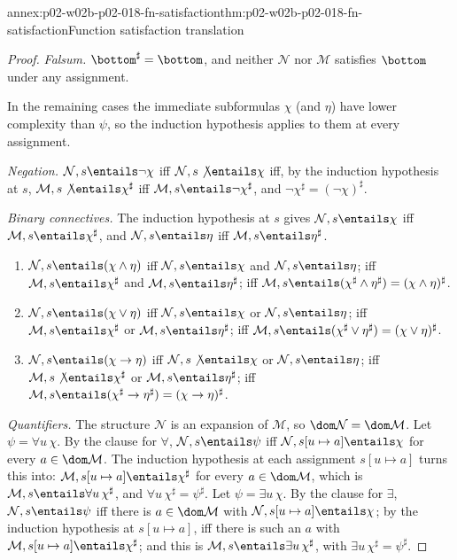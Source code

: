 \begin{annexitem}{annex:p02-w02b-p02-018-fn-satisfaction}{thm:p02-w02b-p02-018-fn-satisfaction}{Function satisfaction translation}
\begin{proof}
\emph{Falsum.}  \(\bottom^{\sharp}=\bottom\), and neither \(\mathcal N\)
nor \(\mathcal M\) satisfies \(\bottom\) under any assignment.

In the remaining cases the immediate subformulas \(\chi\) (and \(\eta\))
have lower complexity than \(\psi\), so the induction hypothesis applies to
them at every assignment.

\emph{Negation.}  \(\mathcal N,s\entails\neg\chi\) iff
\(\mathcal N,s\not\entails\chi\) iff, by the induction hypothesis at \(s\),
\(\mathcal M,s\not\entails\chi^{\sharp}\) iff
\(\mathcal M,s\entails\neg\chi^{\sharp}\), and
\(\neg\chi^{\sharp}=(\neg\chi)^{\sharp}\).

\emph{Binary connectives.}  The induction hypothesis at \(s\) gives
\(\mathcal N,s\entails\chi\) iff \(\mathcal M,s\entails\chi^{\sharp}\), and
\(\mathcal N,s\entails\eta\) iff \(\mathcal M,s\entails\eta^{\sharp}\).
\begin{enumerate}
 \item \(\mathcal N,s\entails(\chi\land\eta)\) iff
       \(\mathcal N,s\entails\chi\) and \(\mathcal N,s\entails\eta\); iff
       \(\mathcal M,s\entails\chi^{\sharp}\) and
       \(\mathcal M,s\entails\eta^{\sharp}\); iff
       \(\mathcal M,s\entails(\chi^{\sharp}\land\eta^{\sharp})
       =(\chi\land\eta)^{\sharp}\).
 \item \(\mathcal N,s\entails(\chi\lor\eta)\) iff
       \(\mathcal N,s\entails\chi\) or \(\mathcal N,s\entails\eta\); iff
       \(\mathcal M,s\entails\chi^{\sharp}\) or
       \(\mathcal M,s\entails\eta^{\sharp}\); iff
       \(\mathcal M,s\entails(\chi^{\sharp}\lor\eta^{\sharp})
       =(\chi\lor\eta)^{\sharp}\).
 \item \(\mathcal N,s\entails(\chi\to\eta)\) iff
       \(\mathcal N,s\not\entails\chi\) or \(\mathcal N,s\entails\eta\); iff
       \(\mathcal M,s\not\entails\chi^{\sharp}\) or
       \(\mathcal M,s\entails\eta^{\sharp}\); iff
       \(\mathcal M,s\entails(\chi^{\sharp}\to\eta^{\sharp})
       =(\chi\to\eta)^{\sharp}\).
\end{enumerate}

\emph{Quantifiers.}  The structure \(\mathcal N\) is an expansion of
\(\mathcal M\), so \(\dom\mathcal N=\dom\mathcal M\).  Let
\(\psi=\forall u\,\chi\).  By the clause for \(\forall\),
\(\mathcal N,s\entails\psi\) iff \(\mathcal N,s[u\mapsto a]\entails\chi\)
for every \(a\in\dom\mathcal M\).  The induction hypothesis at each
assignment \(s[u\mapsto a]\) turns this into:
\(\mathcal M,s[u\mapsto a]\entails\chi^{\sharp}\) for every
\(a\in\dom\mathcal M\), which is
\(\mathcal M,s\entails\forall u\,\chi^{\sharp}\), and
\(\forall u\,\chi^{\sharp}=\psi^{\sharp}\).  Let \(\psi=\exists u\,\chi\).
By the clause for \(\exists\), \(\mathcal N,s\entails\psi\) iff there is
\(a\in\dom\mathcal M\) with \(\mathcal N,s[u\mapsto a]\entails\chi\); by the
induction hypothesis at \(s[u\mapsto a]\), iff there is such an \(a\) with
\(\mathcal M,s[u\mapsto a]\entails\chi^{\sharp}\); and this is
\(\mathcal M,s\entails\exists u\,\chi^{\sharp}\), with
\(\exists u\,\chi^{\sharp}=\psi^{\sharp}\).


\end{proof}
\end{annexitem}
